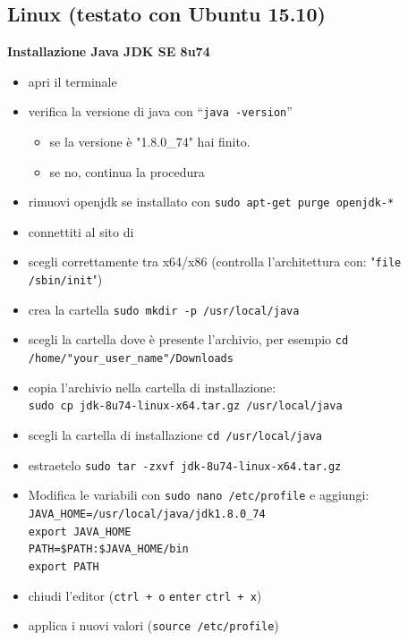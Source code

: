 \documentclass{article}
\begin{document}
\subsection{Linux (testato con Ubuntu 15.10)}
\textbf{Installazione Java JDK SE 8u74}
\begin{itemize}
\item apri il terminale
\item  verifica la versione di java con ``\texttt{java -version}''
\begin{itemize}
\item se la versione \`e "1.8.0\_74" hai finito.
\item se no, continua la procedura
\end{itemize}
\item rimuovi openjdk se installato con \texttt{sudo apt-get purge openjdk-*}
\item connettiti al sito di
  \href{http://www.oracle.com/technetwork/java/javase/downloads/jdk8-downloads-2133151.html}{}
\item scegli correttamente tra x64/x86 (controlla l'architettura con:  "\texttt{file /sbin/init}")
\item crea la cartella \texttt{sudo mkdir -p /usr/local/java}
\item scegli la cartella dove \`e presente l'archivio, per esempio \texttt{cd /home/"your\_user\_name"/Downloads}
\item copia l'archivio nella cartella di installazione:\\
	\verb!sudo cp jdk-8u74-linux-x64.tar.gz /usr/local/java!
\item scegli la cartella di installazione \texttt{cd /usr/local/java}
\item estraetelo \texttt{sudo tar -zxvf jdk-8u74-linux-x64.tar.gz}
\item Modifica le variabili con \texttt{sudo nano /etc/profile}  e
  aggiungi: \\
\texttt{JAVA\_HOME=/usr/local/java/jdk1.8.0\_74} \\
\texttt{export JAVA\_HOME}\\
\texttt{PATH=\$PATH:\$JAVA\_HOME/bin}\\
\texttt{export PATH}
\item chiudi l'editor (\texttt{ctrl + o} \texttt{enter} \texttt{ctrl + x})
\item applica i nuovi valori (\texttt{source /etc/profile})

\end{itemize}
\end{document}
